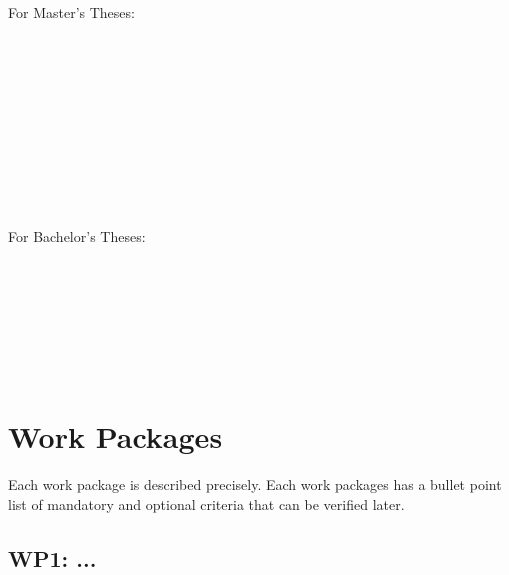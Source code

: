 \documentclass[german=false,thesistype=bachelor,proposal]{tubsthesis}
\begin{document}
\begin{thesis}
For Master's Theses:\\
\begin{ganttchart}{1}{24}
 \\
 \\
 \\
 \\
 \\ %
 \\ %
 \\
 \\
 \\
\end{ganttchart}

For Bachelor's Theses:\\
\begin{ganttchart}{1}{12}
 \\
 \\
 \\
 \\
 \\
 \\
\end{ganttchart}

\section{Work Packages}

Each work package is described precisely.
Each work packages has a bullet point list of mandatory and optional criteria
that can be verified later.
\lipsum[4]

\subsection{WP1: ...}
\lipsum[1]


\end{thesis}
\end{document}

